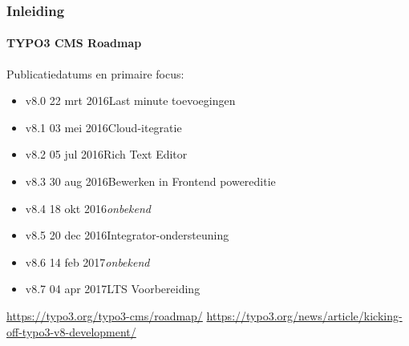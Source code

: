 \begin{frame}[fragile]
	\frametitle{Inleiding}
	\framesubtitle{TYPO3 CMS Roadmap}

	Publicatiedatums en primaire focus:

	\begin{itemize}

		\item v8.0 \tabto{1.1cm}22 mrt 2016\tabto{3.4cm}Last minute toevoegingen
		\item
			\begingroup
				\color{typo3orange}
					v8.1 \tabto{1.1cm}03 mei 2016\tabto{3.4cm}Cloud-itegratie
			\endgroup
		\item v8.2 \tabto{1.1cm}05 jul 2016\tabto{3.4cm}Rich Text Editor
		\item v8.3 \tabto{1.1cm}30 aug 2016\tabto{3.4cm}Bewerken in Frontend powereditie
		\item v8.4 \tabto{1.1cm}18 okt 2016\tabto{3.4cm}\textit{onbekend}
		\item v8.5 \tabto{1.1cm}20 dec 2016\tabto{3.4cm}Integrator-ondersteuning
		\item v8.6 \tabto{1.1cm}14 feb 2017\tabto{3.4cm}\textit{onbekend}
		\item v8.7 \tabto{1.1cm}04 apr 2017\tabto{3.4cm}LTS Voorbereiding

	\end{itemize}

	\smaller
		\url{https://typo3.org/typo3-cms/roadmap/}\newline
		\url{https://typo3.org/news/article/kicking-off-typo3-v8-development/}
	\normalsize

\end{frame}

